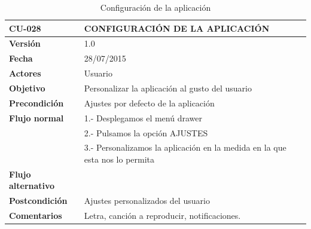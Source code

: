 \documentclass[../pfc.tex]{subfiles}
\begin{document}
	\begin{table}[H]
		\centering
		\begin{tabular}[t]{|p{3cm}|p{9.5cm}|}
			\hline \textbf{CU-028} & \textbf{CONFIGURACIÓN DE LA APLICACIÓN} \\*
			\hline\hline \textbf{Versión} & 1.0 \\*
			\hline\hline \textbf{Fecha} & 28/07/2015 \\*
			\hline\textbf{Actores} 	& Usuario\\*
			\hline \textbf{Objetivo} & Personalizar la aplicación al gusto del usuario\\* 			
			\hline \textbf{Precondición} & Ajustes por defecto de la aplicación\\* 
			\hline \textbf{Flujo normal} & 1.- Desplegamos el menú drawer \\* 
			& 2.- Pulsamos la opción AJUSTES\\*	
			& 3.- Personalizamos la aplicación en la medida en la que esta nos lo permita\\*	
			\hline \textbf{Flujo alternativo} & \\* 
			\hline \textbf{Postcondición} & Ajustes personalizados del usuario\\* 
			\hline \textbf{Comentarios}   & Letra, canción a reproducir, notificaciones.\\*
			\hline
		\end{tabular}
		\caption{Configuración de la aplicación}
		\label{tabla:caso036}
	\end{table}
			
	
\end{document}
